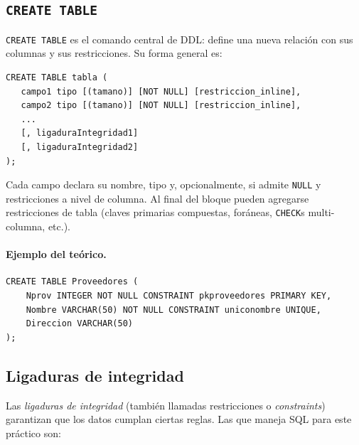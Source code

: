 \documentclass[11pt,a4paper]{article}
\begin{document}
\subsection{\texttt{CREATE TABLE}}

\texttt{CREATE TABLE} es el comando central de DDL: define una nueva relación
con sus columnas y sus restricciones. Su forma general es:

\begin{lstlisting}
CREATE TABLE tabla (
   campo1 tipo [(tamano)] [NOT NULL] [restriccion_inline],
   campo2 tipo [(tamano)] [NOT NULL] [restriccion_inline],
   ...
   [, ligaduraIntegridad1]
   [, ligaduraIntegridad2]
);
\end{lstlisting}

Cada campo declara su nombre, tipo y, opcionalmente, si admite \texttt{NULL}
y restricciones a nivel de columna. Al final del bloque pueden agregarse
restricciones de tabla (claves primarias compuestas, foráneas, \texttt{CHECK}s
multi-columna, etc.).

\paragraph{Ejemplo del teórico.}

\begin{lstlisting}
CREATE TABLE Proveedores (
    Nprov INTEGER NOT NULL CONSTRAINT pkproveedores PRIMARY KEY,
    Nombre VARCHAR(50) NOT NULL CONSTRAINT uniconombre UNIQUE,
    Direccion VARCHAR(50)
);
\end{lstlisting}

\subsection{Ligaduras de integridad}
\label{sec:fk}

Las \emph{ligaduras de integridad} (también llamadas restricciones o
\emph{constraints}) garantizan que los datos cumplan ciertas reglas. Las que
maneja SQL para este práctico son:
\end{document}
